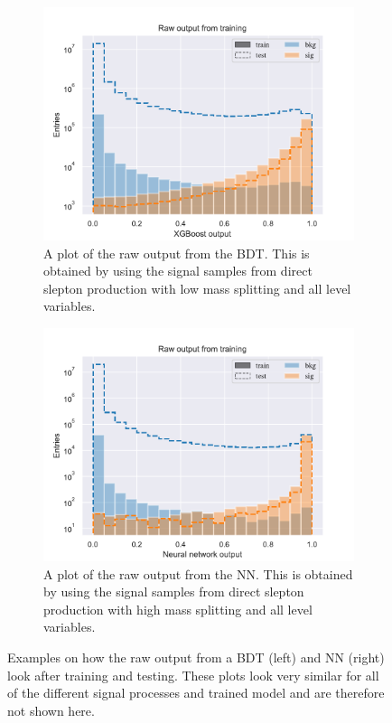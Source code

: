 \begin{figure}[H]
    \centering
    \begin{subfigure}[t!]{0.49\textwidth}
        \includegraphics[width = \textwidth]{Figures/SlepSlep/ML/BDT/All_level/Low/rawPlot.pdf}
        \caption{A plot of the raw output from the BDT. This is obtained by using the signal samples from direct slepton production with low mass splitting and all level variables.}
        \label{fig:SlepSlepBDTLowLevelLowRaw}
    \end{subfigure}
    \begin{subfigure}[t!]{0.49\textwidth}
        \includegraphics[width = \textwidth]{Figures/SlepSlep/ML/NN/All_level/High/rawPlot.pdf}
        \caption{A plot of the raw output from the NN. This is obtained by using the signal samples from direct slepton production with high mass splitting and all level variables.}
        \label{fig:SlepSlepNNLowLevelHighRaw}
    \end{subfigure}
    \caption{Examples on how the raw output from a BDT (left) and NN (right) look after training and testing. These plots look very similar for all of the different signal processes and trained model and are therefore not shown here.}
    \label{fig:rawOutput}
\end{figure}




